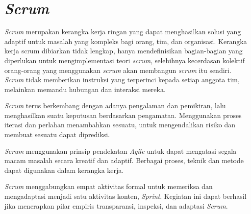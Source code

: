 \section{\emph{Scrum}}
\emph{Scrum} merupakan kerangka kerja ringan yang dapat menghasilkan solusi yang adaptif untuk masalah yang kompleks bagi orang, tim, dan organisasi. Kerangka kerja scrum dibiarkan tidak lengkap, hanya mendefinisikan bagian-bagian yang diperlukan untuk mengimplementasi teori \emph{scrum}, selebihnya kecerdasan kolektif orang-orang yang menggunakan \emph{scrum} akan membangun \emph{scrum} itu sendiri. \emph{Scrum} tidak memberikan instruksi yang terperinci kepada setiap anggota tim, melainkan memandu hubungan dan interaksi mereka.

\emph{Scrum} terus berkembang dengan adanya pengalaman dan pemikiran, lalu menghasilkan suatu keputusan berdasarkan pengamatan. Menggunakan proses iterasi dan perlahan menambahkan sesuatu, untuk mengendalikan risiko dan membuat sesuatu dapat diprediksi.

\emph{Scrum} menggunakan prinsip pendekatan \emph{Agile} untuk dapat mengatasi segala macam masalah secara kreatif dan adaptif. Berbagai proses, teknik dan metode dapat digunakan dalam kerangka kerja. 

\emph{Scrum} menggabungkan empat aktivitas formal untuk memeriksa dan mengadaptasi menjadi satu aktivitas konten, \emph{Sprint}. Kegiatan ini dapat berhasil jika menerapkan pilar empiris transparansi, inspeksi, dan adaptasi \emph{Scrum}. 

